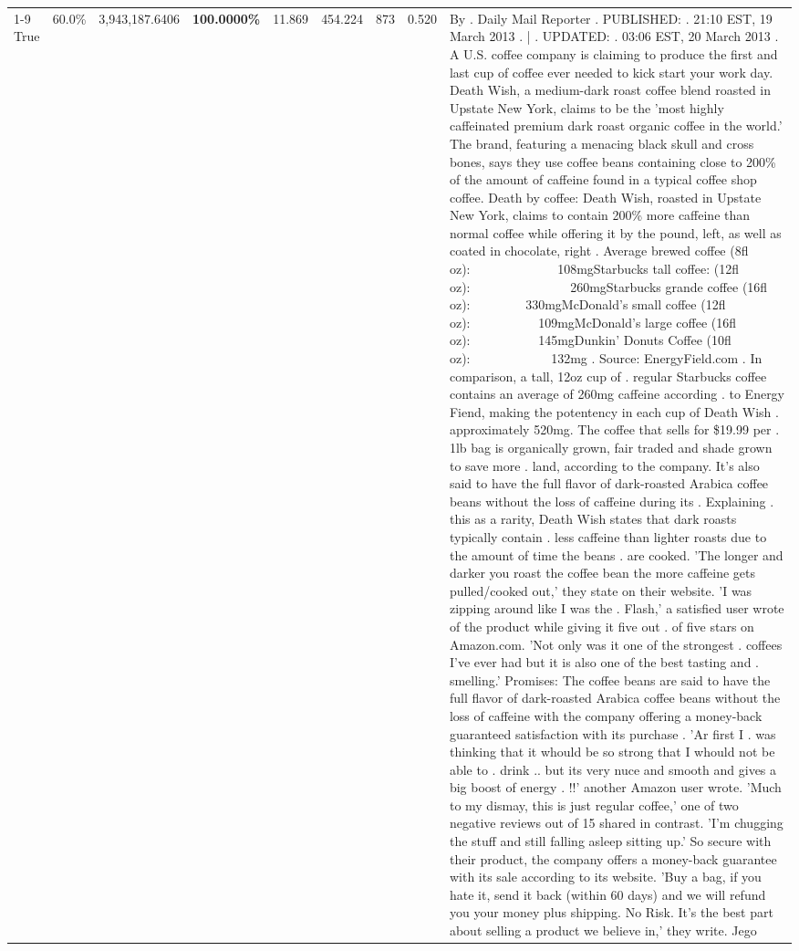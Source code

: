 \begin{table}[H]
{\begin{tabular}{lllrlllll}
\cline{1-9}
True & 60.0\% & 3,943,187.6406 & \bfseries \color{red} 100.0000\% & 11.869 & 454.224 & 873 & 0.520 & By . Daily Mail Reporter . PUBLISHED: . 21:10 EST, 19 March 2013 . | . UPDATED: . 03:06 EST, 20 March 2013 . A U.S. coffee company is claiming to produce the first and last cup of coffee ever needed to kick start your work day. Death Wish, a medium-dark roast coffee blend roasted in Upstate New York, claims to be the 'most highly caffeinated premium dark roast organic coffee in the world.' The brand, featuring a menacing black skull and cross bones, says they use coffee beans containing close to 200\% of the amount of caffeine found in a typical coffee shop coffee. Death by coffee: Death Wish, roasted in Upstate New York, claims to contain 200\% more caffeine than normal coffee while offering it by the pound, left, as well as coated in chocolate, right . Average brewed coffee (8fl oz):              108mgStarbucks tall coffee: (12fl oz):                260mgStarbucks grande coffee (16fl oz):         330mgMcDonald's small coffee (12fl oz):           109mgMcDonald's large coffee (16fl oz):           145mgDunkin' Donuts Coffee (10fl oz):             132mg . Source: EnergyField.com . In comparison, a tall, 12oz cup of . regular Starbucks coffee contains an average of 260mg caffeine according . to Energy Fiend, making the potentency in each cup of Death Wish . approximately 520mg. The coffee that sells for \$19.99 per . 1lb bag is organically grown, fair traded and shade grown to save more . land, according to the company. It's also said to have the full flavor of dark-roasted Arabica coffee beans without the loss of caffeine during its . Explaining . this as a rarity, Death Wish states that dark roasts typically contain . less caffeine than lighter roasts due to the amount of time the beans . are cooked. 'The longer and darker you roast the coffee bean the more caffeine gets pulled/cooked out,' they state on their website. 'I was zipping around like I was the . Flash,' a satisfied user wrote of the product while giving it five out . of five stars on Amazon.com. 'Not only was it one of the strongest . coffees I've ever had but it is also one of the best tasting and . smelling.’ Promises: The coffee beans are said to have the full flavor of dark-roasted Arabica coffee beans without the loss of caffeine with the company offering a money-back guaranteed satisfaction with its purchase . 'Ar first I . was thinking that it whould be so strong that I whould not be able to . drink .. but its very nuce and smooth and gives a big boost of energy . !!' another Amazon user wrote. 'Much to my dismay, this is just regular coffee,' one of two negative reviews out of 15 shared in contrast. 'I'm chugging the stuff and still falling asleep sitting up.' So secure with their product, the company offers a money-back guarantee with its sale according to its website. 'Buy a bag, if you hate it, send it back (within 60 days) and we will refund you your money plus shipping. No Risk. It’s the best part about selling a product we believe in,' they write. Jego \\

\end{tabular}}
\end{table}
